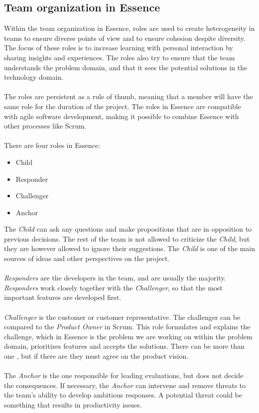\subsection{Team organization in Essence}
\label{sec:team-organization}
Within the team organization in Essence, roles are used to create heterogeneity in teams to ensure diverse points of view and to ensure cohesion despite diversity.
The focus of these roles is to increase learning with personal interaction by sharing insights and experiences.
The roles also try to ensure that the team understands the problem domain, and that it sees the potential solutions in the technology domain.
\\\\
The roles are persistent as a rule of thumb, meaning that a member will have the same role for the duration of the project.
The roles in Essence are compatible with agile software development, making it possible to combine Essence with other processes like Scrum.
\\\\
There are four roles in Essence:
\begin{itemize}
    \item Child
    \item Responder
    \item Challenger
    \item Anchor
\end{itemize}
The \textit{Child} can ask any questions and make propositions that are in opposition to previous decisions.
The rest of the team is not allowed to criticize the \textit{Child}, but they are however allowed to ignore their suggestions.
The \textit{Child} is one of the main sources of ideas and other perspectives on the project.
\\\\
\textit{Responders} are the developers in the team, and are usually the majority.
\textit{Responders} work closely together with the \textit{Challenger}, so that the most important features are developed first.
\\\\
\textit{Challenger} is the customer or customer representative.
The challenger can be compared to the \textit{Product Owner} in Scrum.
This role formulates and explains the challenge, which in Essence is the problem we are working on within the problem domain, prioritizes features and accepts the solutions.
There can be more than one , but if there are they must agree on the product vision.
\\\\
The \textit{Anchor} is the one responsible for leading evaluations, but does not decide the consequences.
If necessary, the \textit{Anchor} can intervene and remove threats to the team's ability to develop ambitious responses.
A potential threat could be something that results in productivity issues.


